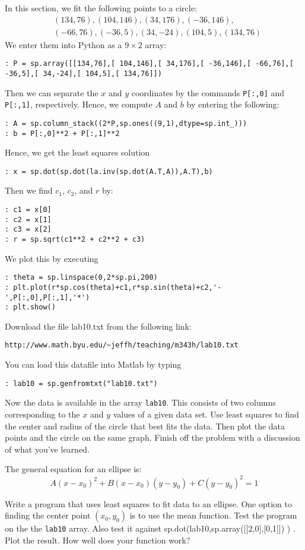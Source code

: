 In this section, we fit the following points to a circle:
\begin{align*}
&(134,76),(104,146),(34,176),(-36,146),\\
&(-66,76),(-36,5),(34,-24),(104,5),(134,76)
\end{align*}
We enter them into Python as a $9\times 2$ array:
\begin{lstlisting}
: P = sp.array([[134,76],[ 104,146],[ 34,176],[ -36,146],[ -66,76],[ -36,5],[ 34,-24],[ 104,5],[ 134,76]])
\end{lstlisting}
Then we can separate the $x$ and $y$ coordinates by the commands {\tt P[:,0]} and {\tt P[:,1]}, respectively.  Hence, we compute $A$ and $b$ by entering the following:
\begin{lstlisting}
: A = sp.column_stack((2*P,sp.ones((9,1),dtype=sp.int_)))
: b = P[:,0]**2 + P[:,1]**2
\end{lstlisting}
Hence, we get the least squares solution
\begin{lstlisting}
: x = sp.dot(sp.dot(la.inv(sp.dot(A.T,A)),A.T),b)
\end{lstlisting}
Then we find $c_1$, $c_2$, and $r$ by:
\begin{lstlisting}
: c1 = x[0]
: c2 = x[1]
: c3 = x[2]
: r = sp.sqrt(c1**2 + c2**2 + c3)
\end{lstlisting}
We plot this by executing
\begin{lstlisting}
: theta = sp.linspace(0,2*sp.pi,200)
: plt.plot(r*sp.cos(theta)+c1,r*sp.sin(theta)+c2,'-',P[:,0],P[:,1],'*')
: plt.show()
\end{lstlisting}

\begin{problem}
Download the file lab10.txt from the following link:
\begin{verbatim}
http://www.math.byu.edu/~jeffh/teaching/m343h/lab10.txt
\end{verbatim}
You can load this datafile into Matlab by typing
\begin{lstlisting}
: lab10 = sp.genfromtxt("lab10.txt")
\end{lstlisting}
Now the data is available in the array {\tt lab10}.  This consists of two columns corresponding to the $x$ and $y$ values of a given data set.  Use least squares to find the center and radius of the circle that best fits the data.  Then plot the data points and the circle on the same graph.  Finish off the problem with a discussion of what you've learned.
\end{problem}

\begin{problem}
The general equation for an ellipse is:
\[
A(x-x_0)^2 + B(x-x_0)(y-y_0) + C(y-y_0)^2 = 1
\]

Write a program that uses least squares to fit data to an ellipse. One option to finding the center point $(x_0,y_0)$ is to use the mean function. Test the program on the the {\tt lab10} array. Also test it against sp.dot(lab10,sp.array([[2,0],[0,1]]) ) . Plot the result. How well does your function work?
\end{problem}
